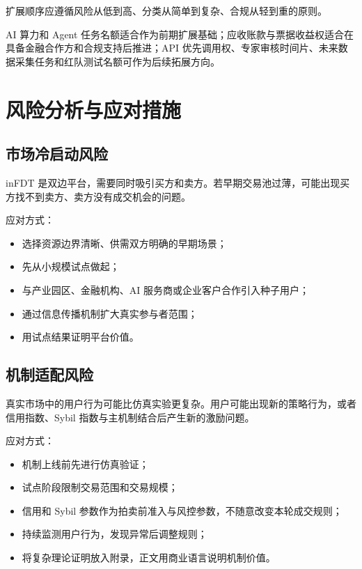 \documentclass[UTF8,a4paper,12pt]{ctexart}
\begin{document}
扩展顺序应遵循风险从低到高、分类从简单到复杂、合规从轻到重的原则。

AI 算力和 Agent 任务名额适合作为前期扩展基础；应收账款与票据收益权适合在具备金融合作方和合规支持后推进；API 优先调用权、专家审核时间片、未来数据采集任务和红队测试名额可作为后续拓展方向。

\newpage
\section{风险分析与应对措施}

\subsection{市场冷启动风险}

inFDT 是双边平台，需要同时吸引买方和卖方。若早期交易池过薄，可能出现买方找不到卖方、卖方没有成交机会的问题。

应对方式：

\begin{itemize}
    \item 选择资源边界清晰、供需双方明确的早期场景；
    \item 先从小规模试点做起；
    \item 与产业园区、金融机构、AI 服务商或企业客户合作引入种子用户；
    \item 通过信息传播机制扩大真实参与者范围；
    \item 用试点结果证明平台价值。
\end{itemize}

\subsection{机制适配风险}

真实市场中的用户行为可能比仿真实验更复杂。用户可能出现新的策略行为，或者信用指数、Sybil 指数与主机制结合后产生新的激励问题。

应对方式：

\begin{itemize}
    \item 机制上线前先进行仿真验证；
    \item 试点阶段限制交易范围和交易规模；
    \item 信用和 Sybil 参数作为拍卖前准入与风控参数，不随意改变本轮成交规则；
    \item 持续监测用户行为，发现异常后调整规则；
    \item 将复杂理论证明放入附录，正文用商业语言说明机制价值。
\end{itemize}
\end{document}

